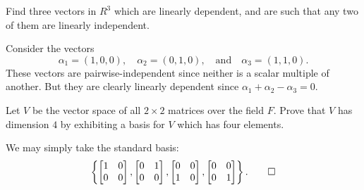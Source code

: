  Find three vectors in $R^3$ which are linearly dependent,
and are such that any two of them are linearly independent.
\begin{solution}
  Consider the vectors
  \begin{equation*}
    \alpha_1 = (1, 0, 0), \quad
    \alpha_2 = (0, 1, 0), \quad\text{and}\quad
    \alpha_3 = (1, 1, 0).
  \end{equation*}
  These vectors are pairwise-independent since neither is a scalar
  multiple of another. But they are clearly linearly dependent since
  $\alpha_1 + \alpha_2 - \alpha_3 = 0$.
\end{solution}

\label{exercise:vec-spaces:F2x2-basis}
Let $V$ be the vector space of all $2\times2$ matrices over the field
$F$. Prove that $V$ has dimension $4$ by exhibiting a basis for $V$
which has four elements.
\begin{solution}
  We may simply take the standard basis:
  \begin{equation*}
    \left\{
      \begin{bmatrix}
        1 & 0 \\ 0 & 0
      \end{bmatrix},
      \begin{bmatrix}
        0 & 1 \\ 0 & 0
      \end{bmatrix},
      \begin{bmatrix}
        0 & 0 \\ 1 & 0
      \end{bmatrix},
      \begin{bmatrix}
        0 & 0 \\ 0 & 1
      \end{bmatrix}
    \right\}. \qedhere
  \end{equation*}
\end{solution}


